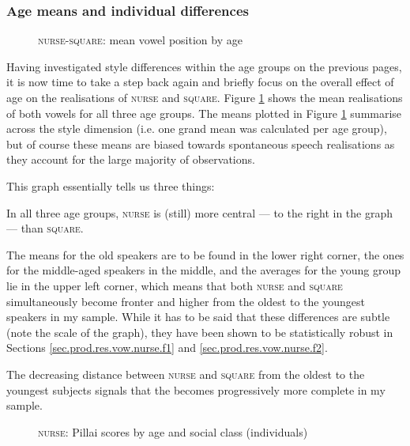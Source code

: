 \subsubsection{Age means and individual differences}

\begin{figure}[h!]
	\centering
		
	\caption{\textsc{nurse}-\textsc{square}: mean vowel position by age}
	\label{fig.nurse.space.means}
\end{figure}

Having investigated style differences within the age groups on the previous pages, it is now time to take a step back again and briefly focus on the overall effect of age on the realisations of \textsc{nurse} and \textsc{square}.
Figure \ref{fig.nurse.space.means} shows the mean realisations of both vowels for all three age groups.
The means plotted in Figure \ref{fig.nurse.space.means} summarise across the style dimension (i.e. one grand mean was calculated per age group), but of course these means are biased towards spontaneous speech realisations as they account for the large majority of observations.

This graph essentially tells us three things:
\begin{inparaenum}[(1)]
	\item In all three age groups, \textsc{nurse} is (still) more central --- to the right in the graph --- than \textsc{square}.
	\item The means for the old speakers are to be found in the lower right corner, the ones for the middle-aged speakers in the middle, and the averages for the young group lie in the upper left corner, which means that both \textsc{nurse} and \textsc{square} simultaneously become fronter and higher from the oldest to the youngest speakers in my sample.
	While it has to be said that these differences are subtle (note the scale of the graph), they have been shown to be statistically robust in Sections \ref{sec.prod.res.vow.nurse.f1} and \ref{sec.prod.res.vow.nurse.f2}.
	\item The decreasing distance between \textsc{nurse} and \textsc{square}  from the oldest to the youngest subjects signals that the  becomes progressively more complete in my sample.
\end{inparaenum}

\begin{figure}[h!]
	\centering
		
	\caption{\textsc{nurse}: Pillai scores by age and social class (individuals)}
	\label{fig.scatter.pillai.nurse}
\end{figure}


